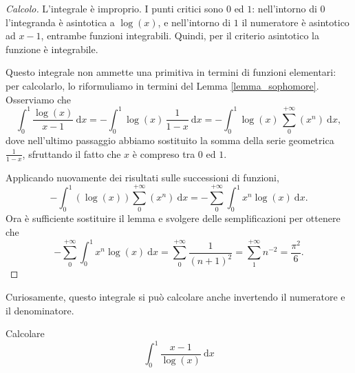 \begin{proof}[Calcolo]
	L'integrale è improprio. 
	I punti critici sono $0$ ed $1$: nell'intorno di $0$ l'integranda è asintotica a $ \log(x)$, e nell'intorno di $1$ il numeratore è asintotico ad $x-1$, entrambe funzioni integrabili. 
	Quindi, per il criterio asintotico la funzione è integrabile.

	Questo integrale non ammette una primitiva in termini di funzioni elementari: per calcolarlo, lo riformuliamo in termini del Lemma \ref{lemma_sophomore}. 
	Osserviamo che
	\begin{equation*}
		\int^1_0 \frac{ \log(x)}{x-1} \: \mathrm{d}x=
		- \int^1_0 \log(x) \, \frac{1}{1-x} \: \mathrm{d}x=
		- \int^1_0 \log(x) \, \sum^{+ \infty}_0(x^n) \: \mathrm{d}x,
	\end{equation*}
	dove nell'ultimo passaggio abbiamo sostituito la somma della serie geometrica $ \frac{1}{1-x}$, sfruttando il fatto che $x$ è compreso tra $0$ ed $1$.

	Applicando nuovamente dei risultati sulle successioni di funzioni,
	\begin{equation*}
	- \int^1_0 \left( \log(x) \right) \sum^{+ \infty}_0(x^n) \: \mathrm{d}x=
	- \sum^{+ \infty}_0 \int^1_0x^n \log(x) \: \mathrm{d}x.
	\end{equation*}
	Ora è sufficiente sostituire il lemma e svolgere delle semplificazioni per ottenere che
	\begin{equation*}
	- \sum^{+ \infty}_0 \int^1_0x^n \log(x) \: \mathrm{d}x=
	\sum^{+ \infty}_{0} \frac{1}{(n+1)^2}= 
	\sum^{+ \infty}_{1}n^{-2}= 
	\frac{ \pi^2}{6}.
	\end{equation*}
\end{proof}
Curiosamente, questo integrale si può calcolare anche invertendo il numeratore e il denominatore.
\begin{Res} Calcolare
	\begin{equation*}
		\int^1_0 \frac{x-1}{ \log(x)} \: \mathrm{d}x
	\end{equation*}
\end{Res}
